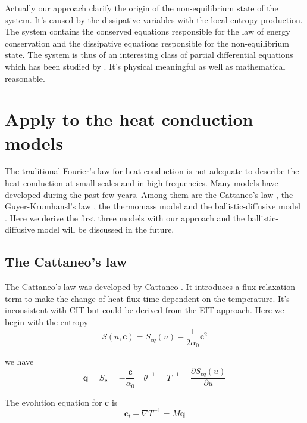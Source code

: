 \documentclass[a4paper]{article}
\begin{document}
Actually our approach clarify the origin of the non-equilibrium state of the system. It's caused by the dissipative variables with the local entropy production. The system contains the conserved equations responsible for the law of energy conservation and the dissipative equations responsible for the non-equilibrium state. The system is thus of an interesting class of partial differential equations which has been studied by \cite{yong2008interesting}. It's physical meaningful as well as mathematical reasonable.

\section{Apply to the heat conduction models}
The traditional Fourier's law for heat conduction is not adequate to describe the heat conduction at small scales and in high frequencies. Many models have developed during the past few years. Among them are the Cattaneo's law \cite{cattaneo2011sulla}, the Guyer-Krumhansl's law \cite{guyer1966solution}, the thermomass model \cite{zeng2006motion,dong2011generalized} and the ballistic-diffusive model \cite{chen2002ballistic,chen2001ballistic}. Here we derive the first three models with our approach and the ballistic-diffusive model will be discussed in the future. 

\subsection{The Cattaneo's law}

The Cattaneo's law was developed by Cattaneo \cite{cattaneo2011sulla}. It introduces a flux relaxation term to make the change of heat flux time dependent on the temperature. It's inconsistent with CIT but could be derived from the EIT approach. Here we begin with the entropy 
\begin{equation}
S(u,\mathbf{c})=S_{eq}(u)-\frac{1}{2\alpha_0} \mathbf{c}^2
\end{equation}

we have
\begin{equation}
\mathbf{q}=S_{\mathbf{c}}=-\frac{\mathbf{c}}{\alpha_0} \quad \theta^{-1}=T^{-1}=\frac{\partial S_{eq}(u)}{\partial u}
\end{equation}

The evolution equation for $\mathbf{c}$ is 
\begin{equation}
\mathbf{c}_t+\nabla T^{-1} =M\mathbf{q}
\end{equation}
\end{document}
